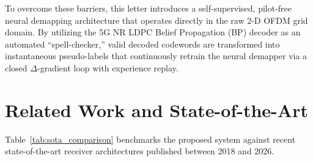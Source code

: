 ﻿\documentclass[journal,twoside]{IEEEtran}
\begin{document}
To overcome these barriers, this letter introduces a self-supervised, pilot-free
neural demapping architecture that operates directly in the raw 2-D OFDM grid
domain. By utilizing the 5G NR LDPC Belief Propagation (BP) decoder as an automated
``spell-checker,'' valid decoded codewords are transformed into instantaneous
pseudo-labels that continuously retrain the neural demapper via a closed
$\Delta$-gradient loop with experience replay.

\section{Related Work and State-of-the-Art}\label{sec:related}

Table~\ref{tab:sota_comparison} benchmarks the proposed system against recent
state-of-the-art receiver architectures published between 2018 and 2026.
\end{document}
